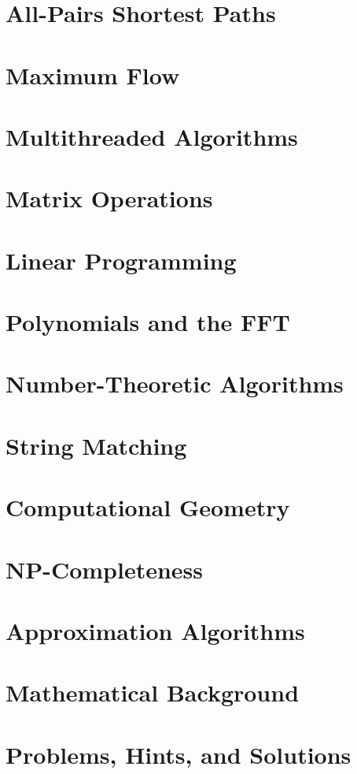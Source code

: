 \documentclass{book}
\begin{document}
\chapter{All-Pairs Shortest Paths}

\chapter{Maximum Flow}

\chapter{Multithreaded Algorithms}

\chapter{Matrix Operations}

\chapter{Linear Programming}

\chapter{Polynomials and the FFT}

\chapter{Number-Theoretic Algorithms}

\chapter{String Matching}

\chapter{Computational Geometry}

\chapter{NP-Completeness}

\chapter{Approximation Algorithms}

\chapter{Mathematical Background}

\chapter{Problems, Hints, and Solutions}
\end{document}
